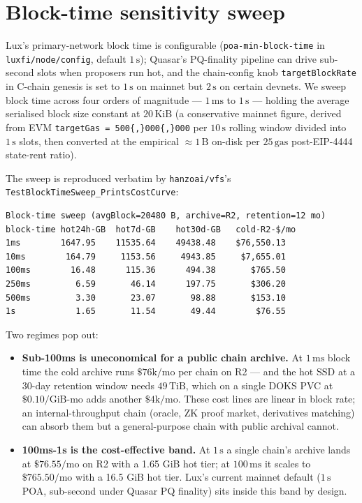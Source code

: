 \documentclass[11pt,a4paper]{article}
\begin{document}
\section{Block-time sensitivity sweep}
\label{sec:blocktime}

Lux's primary-network block time is configurable
(\verb|poa-min-block-time| in \texttt{luxfi/node/config}, default
$1\,\text{s}$); Quasar's PQ-finality pipeline can drive sub-second
slots when proposers run hot, and the chain-config knob
\verb|targetBlockRate| in C-chain genesis is set to $1\,\text{s}$ on
mainnet but $2\,\text{s}$ on certain devnets. We sweep block time
across four orders of magnitude --- $1\,\text{ms}$ to $1\,\text{s}$
--- holding the average serialised block size constant at
$20\,\text{KiB}$ (a conservative mainnet figure, derived from EVM
\verb|targetGas = 500{,}000{,}000| per $10\,\text{s}$ rolling window
divided into $1\,\text{s}$ slots, then converted at the empirical
$\approx 1\,\text{B}$ on-disk per $25\,\text{gas}$ post-EIP-4444
state-rent ratio).

The sweep is reproduced verbatim by
\texttt{hanzoai/vfs}'s \texttt{TestBlockTimeSweep\_PrintsCostCurve}:

\begin{lstlisting}
Block-time sweep (avgBlock=20480 B, archive=R2, retention=12 mo)
block-time hot24h-GB  hot7d-GB    hot30d-GB   cold-R2-$/mo
1ms        1647.95    11535.64    49438.48    $76,550.13
10ms        164.79     1153.56     4943.85     $7,655.01
100ms        16.48      115.36      494.38       $765.50
250ms         6.59       46.14      197.75       $306.20
500ms         3.30       23.07       98.88       $153.10
1s            1.65       11.54       49.44        $76.55
\end{lstlisting}

\noindent
Two regimes pop out:

\begin{itemize}
  \item \textbf{Sub-100ms is uneconomical for a public chain archive.}
    At $1\,\text{ms}$ block time the cold archive runs $\$76\text{k}/\text{mo}$ per chain on R2 --- and the hot SSD at a 30-day retention window
    needs $49\,\text{TiB}$, which on a single DOKS PVC at
    $\$0.10/\text{GiB-mo}$ adds another $\$4\text{k}/\text{mo}$. These
    cost lines are linear in block rate; an internal-throughput chain
    (oracle, ZK proof market, derivatives matching) can absorb them but
    a general-purpose chain with public archival cannot.
  \item \textbf{100ms-1s is the cost-effective band.} At $1\,\text{s}$
    a single chain's archive lands at $\$76.55/\text{mo}$ on R2 with a
    1.65 GiB hot tier; at $100\,\text{ms}$ it scales to
    $\$765.50/\text{mo}$ with a 16.5 GiB hot tier. Lux's current
    mainnet default ($1\,\text{s}$ POA, sub-second under Quasar PQ
    finality) sits inside this band by design.
\end{itemize}
\end{document}
